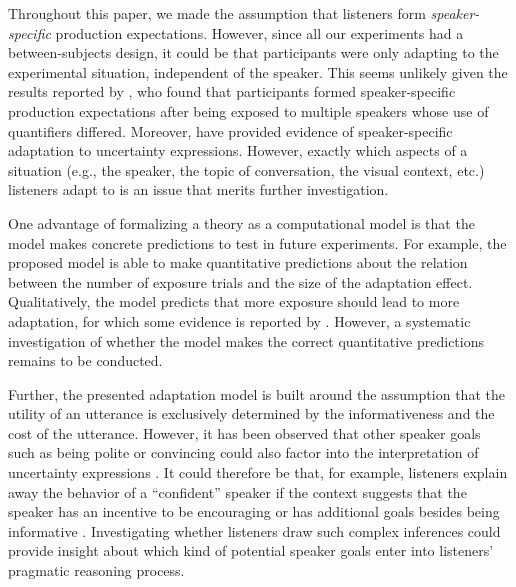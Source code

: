 \documentclass[man, floatsintext]{apa6}
\newcommand{\jd}[1]{\textcolor{PinkyPurple}{\textbf{[jd: #1]}}}
\begin{document}
Throughout this paper, we made the assumption that listeners  form \textit{speaker-specific} production expectations. However,
since all our experiments had a between-subjects design, it could be that participants were only adapting to the experimental
situation, independent of the speaker. This seems unlikely given the results reported by \textcite{Yildirim2016}, who found that
participants formed speaker-specific production expectations after being exposed to multiple speakers whose use of
quantifiers differed. Moreover,  \textcite{Schuster2019} have provided evidence of speaker-specific adaptation to 
uncertainty expressions. However, exactly which aspects of a situation (e.g., the speaker, the topic of conversation, the visual context, etc.)
listeners adapt to is an issue that merits further investigation.


One advantage of formalizing a theory as a computational model is that the model 
makes concrete predictions to test in future experiments. For example, the proposed
model is able to make quantitative predictions about the relation between the number of exposure
trials and the size of the adaptation effect. Qualitatively, the model predicts that more exposure
should lead to more adaptation, for which some evidence is reported by \textcite{Schuster2019}.
However,  a systematic investigation of whether the model makes the correct quantitative predictions remains to be conducted. 


Further, the presented adaptation model is built around the assumption that the utility of an utterance is exclusively determined
by the informativeness and the cost of the utterance. However, it has been observed that other speaker goals such as being polite or
convincing could also factor into the interpretation of uncertainty expressions \parencite[see e.g,][]{Pighin2011,Juanchich2013,Holtgraves2016}.
It could therefore be that, for example, listeners explain away the behavior of a ``confident'' speaker if the context suggests that the speaker
has an incentive to be encouraging or has additional goals besides being informative \parencite[see also][]{Yoon2016,Yoon2017}. Investigating whether listeners draw such complex inferences
could provide  insight about which kind of potential speaker goals enter into listeners' pragmatic reasoning process.
\end{document}
